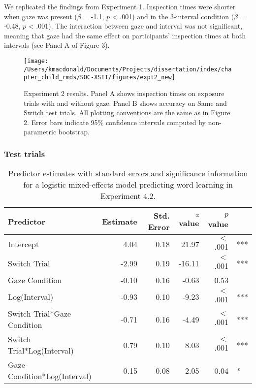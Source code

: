 \documentclass[oneside]{report}
\begin{document}
We replicated the findings from Experiment 1. Inspection times were
shorter when gaze was present (\(\beta\) = -1.1, \(p\) \textless{} .001)
and in the 3-interval condition (\(\beta\) = -0.48, \(p\) \textless{}
.001). The interaction between gaze and interval was not significant,
meaning that gaze had the same effect on participants' inspection times
at both intervals (see Panel A of Figure 3).
\begin{figure}[t]

{\centering \texttt{[image: /Users/kmacdonald/Documents/Projects/dissertation/index/chapter\_child\_rmds/SOC-XSIT/figures/expt2\_new]} 

}

\caption[Experiment 4.2 results]{Experiment 2 results. Panel A shows inspection times on exposure trials with and without gaze. Panel B shows accuracy on Same and Switch test trials. All plotting conventions are the same as in Figure 2. Error bars indicate 95\% confidence intervals computed by non-parametric bootstrap.}\label{fig:expt2-plot}
\end{figure}
\hypertarget{test-trials-1}{%
\subsubsection{Test trials}\label{test-trials-1}}
\begin{table}[tb]
\centering
\begin{tabular}{lrrrrl}
 Predictor & Estimate & Std. Error & $z$ value & $p$ value &  \\ 
  \hline
Intercept & 4.04 & 0.18 & 21.97 & $<$ .001 & *** \\ 
  Switch Trial & -2.99 & 0.19 & -16.11 & $<$ .001 & *** \\ 
  Gaze Condition & -0.10 & 0.16 & -0.63 & 0.53 &  \\ 
  Log(Interval) & -0.93 & 0.10 & -9.23 & $<$ .001 & *** \\ 
  Switch Trial*Gaze Condition & -0.71 & 0.16 & -4.49 & $<$ .001 & *** \\ 
  Switch Trial*Log(Interval) & 0.79 & 0.10 & 8.03 & $<$ .001 & *** \\ 
  Gaze Condition*Log(Interval) & 0.15 & 0.08 & 2.05 & 0.04 & * \\ 
   \hline
\end{tabular}
\caption{Predictor estimates with standard errors and significance information for a logistic mixed-effects model predicting word learning in Experiment 4.2.} 
\label{tab:exp2_reg}
\end{table}
\end{document}
